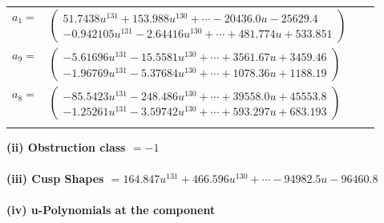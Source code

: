 \documentclass[1p]{elsarticle_modified}
\theoremstyle{definition}
\begin{document}
\begin{tabular}{m{7pt} m{180pt} m{7pt} m{180pt} }
\flushright $a_{1}=$&$\begin{pmatrix}51.7438 u^{131}+153.988 u^{130}+\cdots-20436.0 u-25629.4\\-0.942105 u^{131}-2.64416 u^{130}+\cdots+481.774 u+533.851\end{pmatrix}$ \\
\flushright $a_{9}=$&$\begin{pmatrix}-5.61696 u^{131}-15.5581 u^{130}+\cdots+3561.67 u+3459.46\\-1.96769 u^{131}-5.37684 u^{130}+\cdots+1078.36 u+1188.19\end{pmatrix}$ \\
\flushright $a_{8}=$&$\begin{pmatrix}-85.5423 u^{131}-248.486 u^{130}+\cdots+39558.0 u+45553.8\\-1.25261 u^{131}-3.59742 u^{130}+\cdots+593.297 u+683.193\end{pmatrix}$\\&\end{tabular}
\flushleft \textbf{(ii) Obstruction class $= -1$}\\~\\
\flushleft \textbf{(iii) Cusp Shapes $= 164.847 u^{131}+466.596 u^{130}+\cdots-94982.5 u-96460.8$}\\~\\
\newpage\renewcommand{\arraystretch}{1}
\flushleft \textbf{(iv) u-Polynomials at the component}\newline \\
\end{document}

